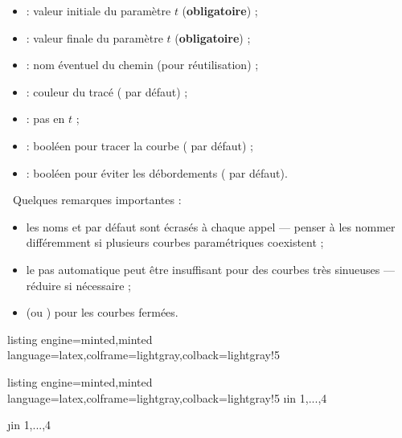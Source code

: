 \documentclass[11pt,a4paper]{ltxdoc}
\begin{document}
\begin{itemize}
  \item {} : valeur initiale du paramètre $t$ (\textbf{obligatoire}) ;
  \item {} : valeur finale du paramètre $t$ (\textbf{obligatoire}) ;
  \item {} : nom éventuel du chemin (pour réutilisation) ;
  \item {} : couleur du tracé ( par défaut) ;
  \item {} : pas en $t$ ;
  \item {} : booléen pour tracer la courbe ( par défaut) ;
  \item {} : booléen pour éviter les débordements ( par défaut).
\end{itemize}

{\footnotesize\faBomb}~Quelques remarques importantes :

\begin{itemize}
  \item les noms  et  par défaut sont écrasés à chaque appel — penser à les nommer différemment si plusieurs courbes paramétriques coexistent ;
  \item le pas automatique peut être insuffisant pour des courbes très sinueuses — réduire  si nécessaire ;
  \item {} (ou ) pour les courbes fermées.
\end{itemize}

\begin{tcblisting}{listing engine=minted,minted language=latex,colframe=lightgray,colback=lightgray!5}
\begin{GraphiqueTikz}[Xmin=-1.5,Xmax=1.5,Ymin=-1.5,Ymax=1.5]
  \TracerAxesGrilles{}{}
\end{GraphiqueTikz}
\end{tcblisting}

\begin{tcblisting}{listing engine=minted,minted language=latex,colframe=lightgray,colback=lightgray!5}
\foreach \i in {1,...,4}{%
  \noindent%
  \foreach \j in {1,...,4}{%
    \begin{GraphiqueTikz}[Xmin=-1.5,Xmax=1.5,Ymin=-1.5,Ymax=1.5]
      \TracerAxesGrilles{}{}
    \end{GraphiqueTikz}
  }%
  \par
}
\end{tcblisting}
\end{document}
